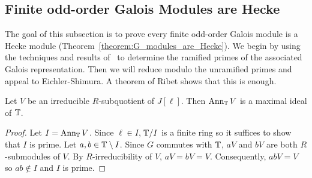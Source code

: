 \documentclass{article}
\begin{document}
\subsection{Finite odd-order Galois Modules are Hecke}%
\label{sub:finite_odd_order_galois_modules_are_hecke}

The goal of this subsection is to prove every finite odd-order Galois module is
a Hecke module (Theorem~\ref{theorem:G_modules_are_Hecke}). We begin by using
the techniques and results of~\cite[\S 14]{mazur:eisenstein} to determine the
ramified primes of the associated Galois representation. Then we will reduce
modulo the unramified primes and appeal to Eichler-Shimura. A theorem of Ribet
shows that this is enough.

\begin{lemma}\label{lemma:cherry_street}
    Let $V$ be an irreducible $R$-subquotient of $J[\ell]$. Then $\operatorname{Ann}_{\mathbb{T}} V$
    is a maximal ideal of $\mathbb{T}$.
\end{lemma}
\begin{proof}
    Let $I=\operatorname{Ann}_{\mathbb{T}} V$. Since $\ell\in I$, $\mathbb{T}/I$ is a finite ring so it
    suffices to show that $I$ is prime. Let $a,b\in \mathbb{T}\setminus I$. Since $G$
    commutes with $\mathbb{T}$, $aV$ and $bV$ are both $R$-submodules of $V$. By
    $R$-irreducibility of $V$, $aV=bV=V$. Consequently, $abV=V$ so $ab\notin I$
    and $I$ is prime.
\end{proof}
\end{document}
